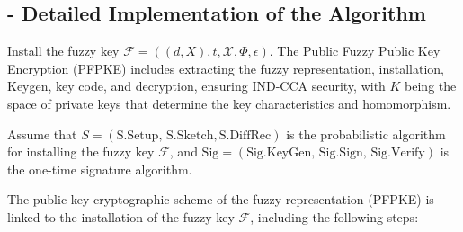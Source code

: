 \documentclass[graybox]{svmult}
\begin{document}
\subsection*{- Detailed Implementation of the Algorithm}
Install the fuzzy key \( \mathcal{F} = ((d, X), t, \mathcal{X}, \varPhi, \epsilon) \). The Public Fuzzy Public Key \allowbreak Encryption (PFPKE) includes extracting the fuzzy representation, installation, \allowbreak Keygen, key code, and decryption, ensuring IND-CCA security, with \( K \) being the space of private keys that determine the key characteristics and homomorphism.

Assume that \( S = (\text{S.Setup},\, \text{S.Sketch}, \text{S.DiffRec}) \) is the probabilistic algorithm for installing the fuzzy key \( \mathcal{F} \), and \( \text{Sig} = (\text{Sig.KeyGen},\, \text{Sig.Sign},\, \text{Sig.Verify}) \) is the \allowbreak one-time signature algorithm.

The public-key cryptographic scheme of the fuzzy representation (PFPKE) is linked to the installation of the fuzzy key \( \mathcal{F} \), including the following steps:
\end{document}

